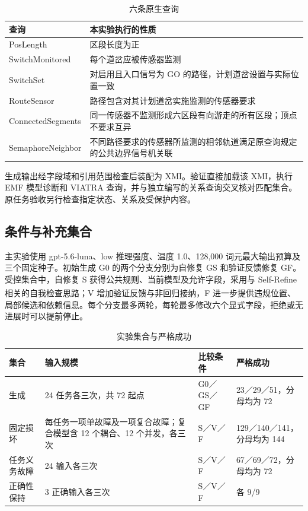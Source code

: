 \documentclass[pdflatex,iicol,sn-mathphys-num]{sn-jnl}
\newcommand{\paperref}[1]{\textsuperscript{\textcolor{citationred}{\citep{#1}}}}
\begin{document}
\begin{table}[!tbp]
\centering
\caption{六条原生查询}\label{tab:C1}
\small
\setlength{\tabcolsep}{4pt}
\renewcommand{\arraystretch}{1.20}
\begin{tabularx}{\textwidth}{@{}>{\hsize}L>{\hsize}L@{}}
\toprule
\textbf{查询} & \textbf{本实验执行的性质} \\
\midrule
PosLength & 区段长度为正 \\
SwitchMonitored & 每个道岔应被传感器监测 \\
SwitchSet & 对启用且入口信号为 GO 的路径，计划道岔设置与实际位置一致 \\
RouteSensor & 路径包含对其计划道岔实施监测的传感器要求 \\
ConnectedSegments & 同一传感器不监测形成六区段有向游走的所有区段；顶点不要求互异 \\
SemaphoreNeighbor & 不同路径要求的传感器所监测的相邻轨道满足原查询规定的公共边界信号机关联 \\
\bottomrule
\end{tabularx}
\end{table}

生成输出经字段域和引用范围检查后装配为 XMI。验证直接加载该 XMI，执行 EMF 模型诊断和 VIATRA 查询，并与独立编写的关系查询交叉核对匹配集合。原任务验收另行检查指定状态、关系及受保护内容。


\subsection{条件与补充集合}\label{app:C-2}

主实验使用 gpt-5.6-luna、low 推理强度、温度 1.0、128,000 词元最大输出预算及三个固定种子。初始生成 G0 的两个分支分别为自修复 GS 和验证反馈修复 GF。受控集合中，自修复 S 获得公共规则、当前模型及允许字段，采用与 Self-Refine 相关的自我检查思路\paperref{NEURIPS2023_91edff07}；V 增加验证反馈与非回归接纳，F 进一步提供违规位置、局部候选和依赖信息。每个分支最多两轮，每轮最多修改六个显式字段，拒绝或无进展时可以提前停止。


\begin{table}[!tbp]
\centering
\caption{实验集合与严格成功}\label{tab:C2}
\small
\setlength{\tabcolsep}{4pt}
\renewcommand{\arraystretch}{1.20}
\begin{tabularx}{\textwidth}{@{}L L L L@{}}
\toprule
\textbf{集合} & \textbf{输入规模} & \textbf{比较条件} & \textbf{严格成功} \\
\midrule
生成 & 24 任务各三次，共 72 起点 & G0／GS／GF & 23／29／51，分母均为 72 \\
固定损坏 & 每任务一项单故障及一项复合故障；复合模型含 12 个耦合、12 个并发，各三次 & S／V／F & 129／140／141，分母均为 144 \\
任务义务故障 & 24 输入各三次 & S／V／F & 67／69／72，分母均为 72 \\
正确性保持 & 3 正确输入各三次 & S／V／F & 各 9/9 \\
\bottomrule
\end{tabularx}
\end{table}
\end{document}
